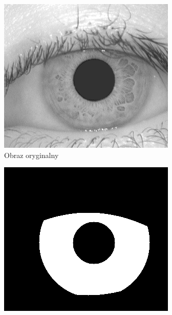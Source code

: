 \documentclass[10pt,polish,a4paper,oneside]{ppfcmthesis}
\begin{document}
\begin{figure}[ht]
  \centering
  \begin{subfigure}[b]{0.35\textwidth}
    \includegraphics[width=\textwidth]{images/normalization/original.png}
    \caption{Obraz oryginalny}
  \end{subfigure}
  \begin{subfigure}[b]{0.35\textwidth}
    \includegraphics[width=\textwidth]{images/normalization/mask.png}

\end{subfigure}
\end{figure}
\end{document}
